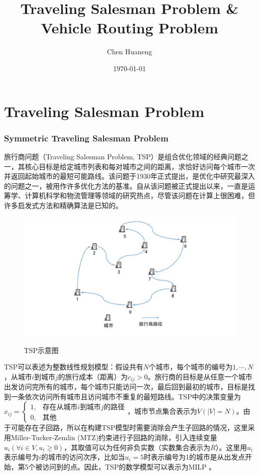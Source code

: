 \documentclass[fontset=none]{ctexart}
\title{Traveling Salesman Problem \& Vehicle Routing Problem}
\author{Chen Huaneng}
\date{\today}
\begin{document}
\maketitle

\part{Traveling Salesman Problem}
\section{Symmetric Traveling Salesman Problem}

旅行商问题（Traveling Salesman Problem, TSP）是组合优化领域的经典问题之一，其核心目标是给定城市列表和每对城市之间的距离，求恰好访问每个城市一次并返回起始城市的最短可能路线。该问题于1930年正式提出，是优化中研究最深入的问题之一，被用作许多优化方法的基准。自从该问题被正式提出以来，一直是运筹学、计算机科学和物流管理等领域的研究热点，尽管该问题在计算上很困难，但许多启发式方法和精确算法是已知的\cite{2009A, 2012Models}。

\begin{figure}[!htb]
    \centering
    \includegraphics[width=\linewidth]{images/TSP.pdf}\\
    \caption{TSP示意图}
\end{figure}

TSP可以表述为整数线性规划模型\cite{papadimitriou1998combinatorial}：假设共有$N$个城市，每个城市的编号为$1,\cdots,N$，从城市$i$到城市$j$的旅行成本（距离）为$c_{ij}>0$。旅行商的目标是从任意一个城市出发访问完所有的城市，每个城市只能访问一次，最后回到最初的城市，目标是找到一条依次访问所有城市且访问城市不重复的最短路线。TSP中的决策变量为$x_{ij}=\begin{cases}1, & \text{存在从城市$i$到城市$j$的路径}\\0, & \text{其他} \end{cases}$，城市节点集合表示为$V(|V| = N)$。由于可能存在子回路，所以在构建TSP模型时需要消除会产生子回路的情况，这里采用Miller-Tucker-Zemlin (MTZ)约束进行子回路的消除\cite{1960Integer}，引入连续变量$u_i(\forall i \in V, u_i \geq 0)$，其取值可以为任何非负实数（实数集合表示为$R$）。这里用$u_i$表示编号为$i$的城市的访问次序，比如当$u_i = 5$时表示编号为1的城市是从出发点开始，第5个被访问到的点。因此，TSP的数学模型可以表示为MILP 。
\end{document}
